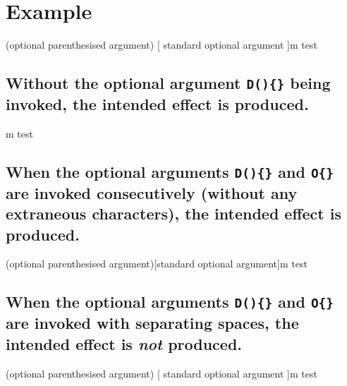 \documentclass{book}
\begin{document}
\chapter{Example}
\begin{foo}(optional parenthesised argument)
    [
        standard optional argument
    ]{m}
    test
\end{foo}


\section{Without the optional argument \textup{\texttt{D()\{\}}} being invoked, the intended effect is produced.}
\def\mycolor{green}
\begin{foo}
    {m}
    test
\end{foo}

\section{When the optional arguments \textup{\texttt{D()\{\}}} and \textup{\texttt{O\{\}}} are invoked consecutively (without any extraneous characters), the intended effect is produced.}
\begin{foo}(optional parenthesised argument)[standard optional argument]{m}
    test
\end{foo}
\section{When the optional arguments \textup{\texttt{D()\{\}}} and \textup{\texttt{O\{\}}} are invoked with separating spaces, the intended effect is \emph{not} produced.}
\def\mycolor{yellow}
\begin{foo}(optional parenthesised argument)
    [
        standard optional argument
    ]{m}
    test
\end{foo}
\end{document}

